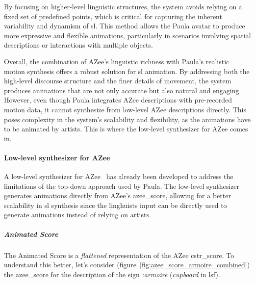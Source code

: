 \documentclass[../../main.tex]{subfiles}
\begin{document}
By focusing on higher-level linguistic structures, the system avoids relying on a fixed set of predefined points, which is critical for capturing the inherent variability and dynamism of \gls{sl}. This method allows the Paula avatar to produce more expressive and flexible animations, particularly in scenarios involving spatial descriptions or interactions with multiple objects.

Overall, the combination of AZee’s linguistic richness with Paula’s realistic motion synthesis offers a robust solution for \gls{sl} animation. By addressing both the high-level discourse structure and the finer details of movement, the system produces animations that are not only accurate but also natural and engaging. However, even though Paula integrates AZee descriptions with pre-recorded motion data, it cannot synthesize from low-level AZee descriptions directly. This poses complexity in the system's scalability and flexibility, as the animations have to be animated by artists. This is where the low-level synthesizer for AZee comes in.

\paragraph{Low-level synthesizer for AZee}
\label{ch:background_work:sign_language_synthesis:3d_techniques:sign_language_synthesis_systems:azee_based:low_level_synthesizer_for_azee}

A low-level synthesizer for AZee~\cite{nunnari2018animating} has already been developed to address the limitations of the top-down approach used by Paula. The low-level synthesizer generates animations directly from AZee's \gls{azee_score}, allowing for a better scalability in \gls{sl} synthesis since the linghuists input can be directly used to generate animations instead of relying on artists.

\subparagraph{Animated Score}
\label{ch:background_work:sign_language_synthesis:3d_techniques:sign_language_synthesis_systems:azee_based:low_level_synthesizer_for_azee:animated_score}

The Animated Score is a \emph{flattened} representation of the AZee \gls{cstr_score}. To understand this better, let's consider (figure~\ref{fig:azee_score_armoire_combined}) the \gls{azee_score} for the description of the sign \emph{:armoire} (\emph{cupboard} in \gls{lsf}).
\end{document}
